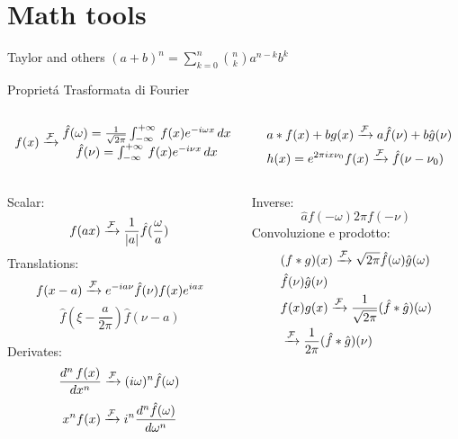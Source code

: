 \documentclass[asd-beamer.tex]{subfiles}
\begin{document}
\section{Math tools}

\begin{wordonframe}{Taylor and others}
$(a+b)^n=\sum_{k=0}^n\binom{n}{k}a^{n-k}b^k$
\end{wordonframe}

\begin{wordonframe}{Propriet\'a Trasformata di Fourier}
\begin{columns}
\begin{column}{0.5\textwidth}
\begin{align*}
f(x)\xrightarrow{\mathcal{F}}{}\begin{matrix}
\hat{f}(\omega)=\frac{1}{\sqrt{2\pi}}\int_{-\infty}^{+\infty}\,f(x)e^{-i\omega x}\,dx\\
\hat{f}(\nu)=\int_{-\infty}^{+\infty}\,f(x)e^{-i\nu x}\,dx\\
\end{matrix}
\end{align*}
\end{column}

\begin{column}{0.5\textwidth}
\begin{align*}
&a*f(x)+bg(x)\xrightarrow{\mathcal{F}}{}a\hat{f}(\nu)+b\hat{g}(\nu)\\
&h(x)=e^{2\pi ix\nu_0}f(x)\xrightarrow{\mathcal{F}}{}\hat{f}(\nu-\nu_0)
\end{align*}
\end{column}
\end{columns}

\begin{columns}
\begin{column}{0.5\textwidth}
Scalar: \[f(ax)\xrightarrow{\mathcal{F}}{}\frac{1}{|a|}\hat{f}(\frac{\omega}{a}) \]
Translations:
\[f(x-a)\xrightarrow{\mathcal{F}}{}e^{-ia\nu}\hat{f}(\nu)f(x)e^{iax}\]
\[\hat{f}(\xi-\frac{a}{2\pi}) \hat{f}(\nu-a)\]

Derivates:
\[\frac{d^n\,f(x)}{dx^n}\xrightarrow{\mathcal{F}}{}(i\omega)^n\hat{f}(\omega)\]
\[x^nf(x)\xrightarrow{\mathcal{F}}{}i^n\frac{d^n\hat{f}(\omega)}{d\omega^n}\]
\end{column}
\begin{column}{0.5\textwidth}
Inverse: \[\hat{a} f(-\omega) 2\pi f(-\nu)\]
Convoluzione e prodotto:
\begin{align*}
&(f*g)(x)\xrightarrow{\mathcal{F}}{}\sqrt{2\pi}\hat{f}(\omega)\hat{g}(\omega)\\
&\hat{f}(\nu)\hat{g}(\nu)\\
&f(x)g(x)\xrightarrow{\mathcal{F}}{}\frac{1}{\sqrt{2\pi}}(\hat{f}*\hat{g})(\omega)\\
&\xrightarrow{\mathcal{F}}{}\frac{1}{2\pi}(\hat{f}*\hat{g})(\nu)
\end{align*}

\end{column}
\end{columns}
\end{wordonframe}
\end{document}
